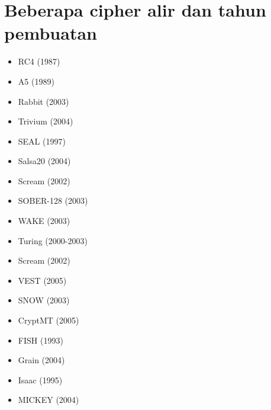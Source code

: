 \documentclass{article}
\begin{document}

\section*{Beberapa cipher alir dan tahun pembuatan}

\begin{itemize}
    \item RC4 (1987)
    \item A5 (1989)
    \item Rabbit (2003)
    \item Trivium (2004)
    \item SEAL (1997)
    \item Salsa20 (2004)
    \item Scream (2002)
    \item SOBER-128 (2003)
    \item WAKE (2003)
\end{itemize}

\begin{itemize}
    \item Turing (2000-2003)
    \item Scream (2002)
    \item VEST (2005)
    \item SNOW (2003)
    \item CryptMT (2005)
    \item FISH (1993)
    \item Grain (2004)
    \item Isaac (1995)
    \item MICKEY (2004)
\end{itemize}
\end{document}
